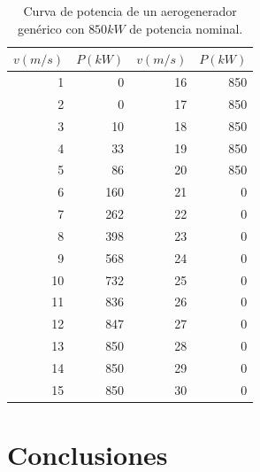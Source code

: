 \documentclass[12pt]{report}
\begin{document}



\begin{table}[H]
    \centering
    \begin{tabular}{r r r r}
        \hline
        $v(m/s)$ & $P(kW)$ & $v(m/s)$ & $P(kW)$ \\
        \hline
        1 & 0 & 16 & 850 \\
        2 & 0 & 17 & 850 \\
        3 & 10 & 18 & 850 \\
        4 & 33 & 19 & 850 \\
        5 & 86 & 20 & 850 \\
        6 & 160 & 21 & 0 \\
        7 & 262 & 22 & 0 \\
        8 & 398 & 23 & 0 \\
        9 & 568 & 24 & 0 \\
        10 & 732 & 25 & 0 \\
        11 & 836 & 26 & 0 \\
        12 & 847 & 27 & 0 \\
        13 & 850 & 28 & 0 \\
        14 & 850 & 29 & 0 \\
        15 & 850 & 30 & 0 \\
        \hline
    \end{tabular}
    \caption{Curva de potencia de un aerogenerador genérico con $850 kW$ de potencia nominal.}
    \label{Tabla: Curva de potencia}
\end{table}

\section{Conclusiones}
\end{document}
